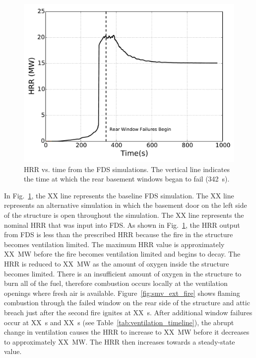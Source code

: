 \documentclass[12pt,oneside]{book}
\begin{document}
\begin{figure}[!ht]
\includegraphics[width=5.5in]{../Figures/Fire_HRR}
\caption[HRR vs. time from the FDS simulations.]
{HRR vs. time from the FDS simulations. The vertical line indicates the time at which the rear basement windows began to fail (342~s).}
\label{fig:hrr}
\end{figure}

In Fig.~\ref{fig:hrr}, the XX line represents the baseline FDS simulation. The XX line represents an alternative simulation in which the basement door on the left side of the structure is open throughout the simulation. The XX line represents the nominal HRR that was input into FDS. As shown in Fig.~\ref{fig:hrr}, the HRR output from FDS is less than the prescribed HRR because the fire in the structure becomes ventilation limited. The maximum HRR value is approximately XX~MW before the fire becomes ventilation limited and begins to decay. The HRR is reduced to XX~MW as the amount of oxygen inside the structure becomes limited. There is an insufficient amount of oxygen in the structure to burn all of the fuel, therefore combustion occurs locally at the ventilation openings where fresh air is available. Figure~\ref{fig:smv_ext_fire} shows flaming combustion through the failed window on the rear side of the structure and attic breach just after the second fire ignites at XX~s. After additional window failures occur at XX~s and XX~s (see Table~\ref{tab:ventilation_timeline}), the abrupt change in ventilation causes the HRR to increase to XX~MW before it decreases to approximately XX~MW. The HRR then increases towards a steady-state value.
\end{document}
